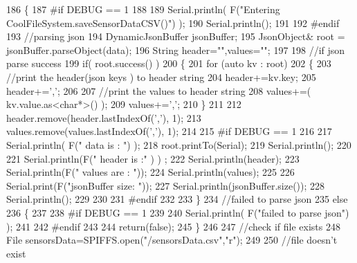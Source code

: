 \begin{DoxyCode}
186 \{
187 \textcolor{preprocessor}{#if DEBUG == 1}
188 
189     Serial.println( F(\textcolor{stringliteral}{"Entering CoolFileSystem.saveSensorDataCSV()"}) );
190     Serial.println();
191 
192 \textcolor{preprocessor}{#endif}
193     \textcolor{comment}{//parsing json}
194     DynamicJsonBuffer jsonBuffer;
195     JsonObject& root = jsonBuffer.parseObject(data);
196     String header=\textcolor{stringliteral}{""},values=\textcolor{stringliteral}{""};
197     
198     \textcolor{comment}{//if json parse success}
199     \textcolor{keywordflow}{if}( root.success() )
200     \{       
201         \textcolor{keywordflow}{for} (\textcolor{keyword}{auto} kv : root) 
202         \{
203             \textcolor{comment}{//print the header(json keys ) to header string}
204             header+=kv.key;
205             header+=\textcolor{charliteral}{','};
206             
207             \textcolor{comment}{//print the values to header string}
208             values+=( kv.value.as<\textcolor{keywordtype}{char}*>() );
209             values+=\textcolor{charliteral}{','};
210         \}
211 
212         header.remove(header.lastIndexOf(\textcolor{charliteral}{','}), 1);
213         values.remove(values.lastIndexOf(\textcolor{charliteral}{','}), 1);      
214     
215 \textcolor{preprocessor}{    #if DEBUG == 1}
216     
217         Serial.println( F(\textcolor{stringliteral}{" data is : "}) );
218         root.printTo(Serial);
219         Serial.println();
220         
221         Serial.println(F(\textcolor{stringliteral}{" header is :"} ) ) ;
222         Serial.println(header);
223         Serial.println(F(\textcolor{stringliteral}{" values are : "}));
224         Serial.println(values);
225         
226         Serial.print(F(\textcolor{stringliteral}{"jsonBuffer size: "}));
227         Serial.println(jsonBuffer.size());
228         Serial.println();
229 
230     
231 \textcolor{preprocessor}{    #endif}
232     
233     \}
234     \textcolor{comment}{//failed to parse json}
235     \textcolor{keywordflow}{else}
236     \{
237     
238 \textcolor{preprocessor}{    #if DEBUG == 1}
239 
240         Serial.println( F(\textcolor{stringliteral}{"failed to parse json"}) );
241     
242 \textcolor{preprocessor}{    #endif}
243 
244         \textcolor{keywordflow}{return}(\textcolor{keyword}{false});
245     \}
246 
247     \textcolor{comment}{//check if file exists}
248     File sensorsData=SPIFFS.open(\textcolor{stringliteral}{"/sensorsData.csv"},\textcolor{stringliteral}{"r"});
249     
250     \textcolor{comment}{//file doesn't exist}

\end{DoxyCode}
